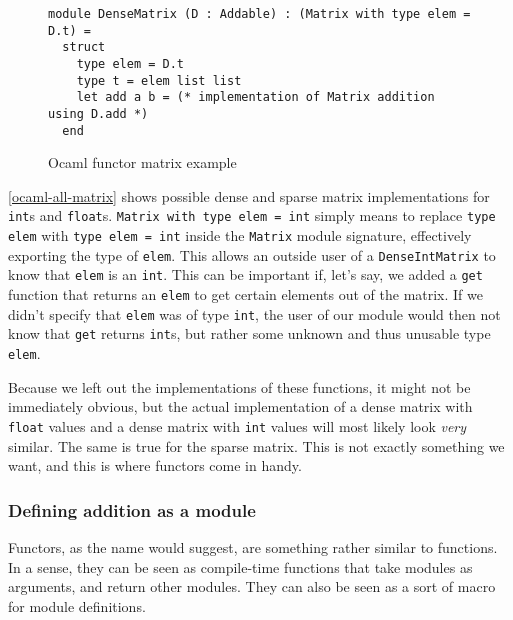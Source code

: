 \begin{figure*}
\begin{verbatim}
module DenseMatrix (D : Addable) : (Matrix with type elem = D.t) =
  struct
    type elem = D.t
    type t = elem list list
    let add a b = (* implementation of Matrix addition using D.add *)
  end
\end{verbatim}
\caption{Ocaml functor matrix example}
\label{ocaml-matrix-functor}
\end{figure*}

\autoref{ocaml-all-matrix} shows possible dense and sparse matrix implementations for \verb|int|s and \verb|float|s. \verb|Matrix with type elem = int| simply means to replace \verb|type elem| with \verb|type elem = int| inside the \verb|Matrix| module signature, effectively exporting the type of \verb|elem|. This allows an outside user of a \verb|DenseIntMatrix| to know that \verb|elem| is an \verb|int|. This can be important if, let's say, we added a \verb|get| function that returns an \verb|elem| to get certain elements out of the matrix. If we didn't specify that \verb|elem| was of type \verb|int|, the user of our module would then not know that \verb|get| returns \verb|int|s, but rather some unknown and thus unusable type \verb|elem|.

Because we left out the implementations of these functions, it might not be immediately obvious, but the actual implementation of a dense matrix with \verb|float| values and a dense matrix with \verb|int| values will most likely look \textit{very} similar. The same is true for the sparse matrix. This is not exactly something we want, and this is where functors come in handy.

\subsubsection{Defining addition as a module}

Functors, as the name would suggest, are something rather similar to functions. In a sense, they can be seen as compile-time functions that take modules as arguments, and return other modules. They can also be seen as a sort of macro for module definitions.

